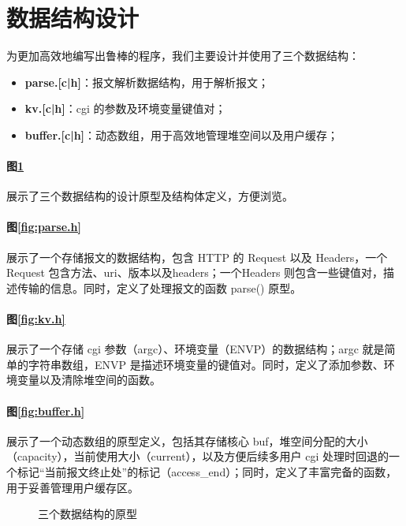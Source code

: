 \section{数据结构设计}

为更加高效地编写出鲁棒的程序，我们主要设计并使用了三个数据结构：
\begin{itemize}
  \item \textbf{parse.[c|h]}：报文解析数据结构，用于解析报文；
  \item \textbf{kv.[c|h]}：cgi 的参数及环境变量键值对；
  \item \textbf{buffer.[c|h]}：动态数组，用于高效地管理堆空间以及用户缓存；
\end{itemize}

\paragraph*{图\ref{fig:3datastructure}}展示了三个数据结构的设计原型及结构体定义，方便浏览。

\paragraph*{图\ref{fig:parse.h}} 展示了一个存储报文的数据结构，包含 HTTP 的 Request 以及 Headers，一个 Request 包含方法、uri、版本以及headers；一个Headers 则包含一些键值对，描述传输的信息。同时，定义了处理报文的函数 parse() 原型。

\paragraph*{图\ref{fig:kv.h}} 展示了一个存储 cgi 参数（argc）、环境变量（ENVP）的数据结构；argc 就是简单的字符串数组，ENVP 是描述环境变量的键值对。同时，定义了添加参数、环境变量以及清除堆空间的函数。

\paragraph*{图\ref{fig:buffer.h}} 展示了一个动态数组的原型定义，包括其存储核心 buf，堆空间分配的大小（capacity），当前使用大小（current），以及方便后续多用户 cgi 处理时回退的一个标记“当前报文终止处”的标记（access\_end）；同时，定义了丰富完备的函数，用于妥善管理用户缓存区。

\begin{figure}[htbp!]
  \centering
  \caption{三个数据结构的原型}\label{fig:3datastructure}
\end{figure}

